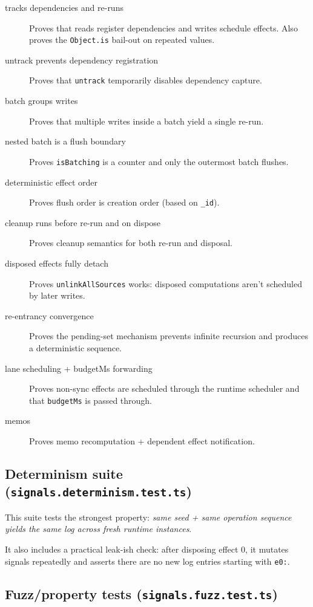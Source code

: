 \begin{description}
  \item[tracks dependencies and re-runs] Proves that reads register dependencies and writes schedule effects. Also proves the \texttt{Object.is} bail-out on repeated values.
  \item[untrack prevents dependency registration] Proves that \texttt{untrack} temporarily disables dependency capture.
  \item[batch groups writes] Proves that multiple writes inside a batch yield a single re-run.
  \item[nested batch is a flush boundary] Proves \texttt{isBatching} is a counter and only the outermost batch flushes.
  \item[deterministic effect order] Proves flush order is creation order (based on \texttt{\_id}).
  \item[cleanup runs before re-run and on dispose] Proves cleanup semantics for both re-run and disposal.
  \item[disposed effects fully detach] Proves \texttt{unlinkAllSources} works: disposed computations aren’t scheduled by later writes.
  \item[re-entrancy convergence] Proves the pending-set mechanism prevents infinite recursion and produces a deterministic sequence.
  \item[lane scheduling + budgetMs forwarding] Proves non-sync effects are scheduled through the runtime scheduler and that \texttt{budgetMs} is passed through.
  \item[memos] Proves memo recomputation + dependent effect notification.
\end{description}

\subsection{Determinism suite (\texttt{signals.determinism.test.ts})}

This suite tests the strongest property: \emph{same seed + same operation sequence yields the same log across fresh runtime instances}.

It also includes a practical leak-ish check: after disposing effect 0, it mutates signals repeatedly and asserts there are no new log entries starting with \texttt{e0:}.

\subsection{Fuzz/property tests (\texttt{signals.fuzz.test.ts})}

